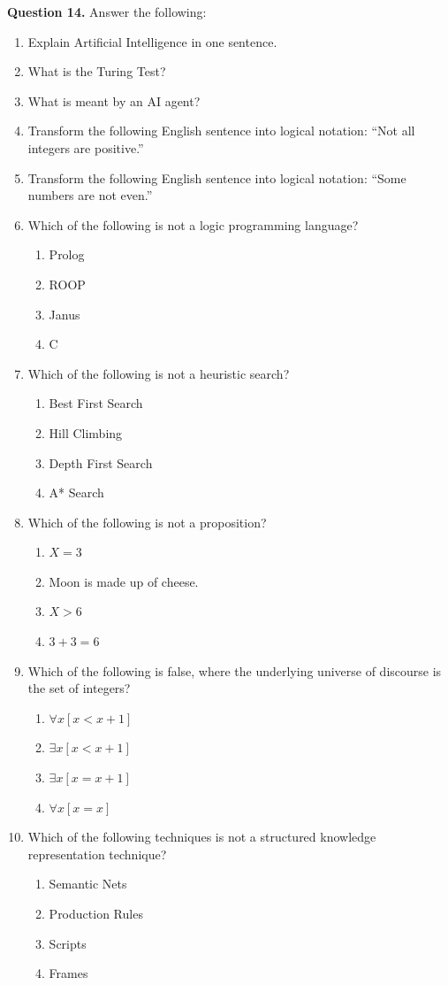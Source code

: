 \documentclass[11pt,a4paper]{article}
\begin{document}
\medskip\noindent\textbf{Question 14.} Answer the following:
\begin{enumerate}[label=(\roman*),leftmargin=*,itemsep=8pt]
  \item Explain Artificial Intelligence in one sentence.
  \item What is the Turing Test?
  \item What is meant by an AI agent?
  \item Transform the following English sentence into logical notation: ``Not all integers are positive.''
  \item Transform the following English sentence into logical notation: ``Some numbers are not even.''
  \item Which of the following is not a logic programming language?
  \begin{enumerate}[label=(\alph*),itemsep=2pt]
    \item Prolog
    \item ROOP
    \item Janus
    \item C
  \end{enumerate}
  \item Which of the following is not a heuristic search?
  \begin{enumerate}[label=(\alph*),itemsep=2pt]
    \item Best First Search
    \item Hill Climbing
    \item Depth First Search
    \item A* Search
  \end{enumerate}
  \item Which of the following is not a proposition?
  \begin{enumerate}[label=(\alph*),itemsep=2pt]
    \item $X = 3$
    \item Moon is made up of cheese.
    \item $X > 6$
    \item $3 + 3 = 6$
  \end{enumerate}
  \item Which of the following is false, where the underlying universe of discourse is the set of integers?
  \begin{enumerate}[label=(\alph*),itemsep=2pt]
    \item $\forall x [x < x+1]$
    \item $\exists x [x < x+1]$
    \item $\exists x [x = x+1]$
    \item $\forall x [x = x]$
  \end{enumerate}
  \item Which of the following techniques is not a structured knowledge representation technique?
  \begin{enumerate}[label=(\alph*),itemsep=2pt]
    \item Semantic Nets
    \item Production Rules
    \item Scripts
    \item Frames
  \end{enumerate}
\end{enumerate}
\end{document}
